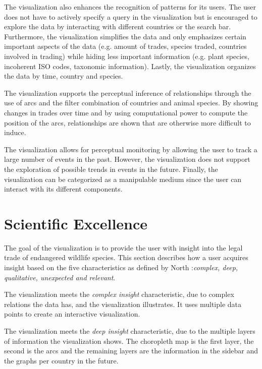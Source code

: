 The visualization also enhances the recognition of patterns for its users. The user does not have to actively specify a query in the visualization but is encouraged to explore the data by interacting with different countries or the search bar. Furthermore, the visualization simplifies the data and only emphasizes certain important aspects of the data (e.g. amount of trades, species traded, countries involved in trading) while hiding less important information (e.g. plant species, incoherent ISO codes, taxonomic information). Lastly, the visualization organizes the data by time, country and species. 

The visualization supports the perceptual inference of relationships through the use of arcs and the filter combination of countries and animal species. By showing changes in trades over time and by using computational power to compute the position of the arcs, relationships are shown that are otherwise more difficult to induce. 

The visualization allows for perceptual monitoring by allowing the user to track a large number of events in the past. However, the visualization does not support the exploration of possible trends in events in the future. Finally, the visualization can be categorized as a manipulable medium since the user can interact with its different components. 

\section{Scientific Excellence} \label{science-excel}
The goal of the visualization is to provide the user with insight into the legal trade of endangered wildlife species. This section describes how a user acquires insight based on the five characteristics as defined by North \cite{North2006}:\textit{complex, deep, qualitative, unexpected and relevant}. 

The visualization meets the \textit{complex insight} characteristic, due to complex relations the data has, and the visualization illustrates. It uses multiple data points to create an interactive visualization. 

The visualization meets the \textit{deep insight} characteristic, due to the multiple layers of information the visualization shows. The choropleth map is the first layer, the second is the arcs and the remaining layers are the information in the sidebar and the graphs per country in the future.

